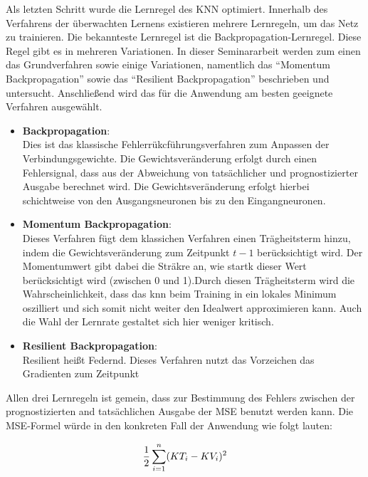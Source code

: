 Als letzten Schritt wurde die Lernregel des KNN optimiert. Innerhalb des Verfahrens der überwachten Lernens existieren mehrere Lernregeln, um das Netz zu trainieren. Die bekannteste Lernregel ist die Backpropagation-Lernregel. Diese Regel gibt es in mehreren Variationen. In dieser Seminararbeit werden zum einen das Grundverfahren sowie einige Variationen, namentlich das  "`Momentum Backpropagation"' sowie das "`Resilient Backpropagation"' beschrieben und untersucht. Anschließend wird das für die Anwendung am besten geeignete Verfahren ausgewählt.

\begin{itemize}
\item \textbf{Backpropagation}:\\
Dies ist das klassische Fehlerrükcführungsverfahren zum Anpassen der Verbindungsgewichte. Die Gewichtsveränderung erfolgt durch einen Fehlersignal, dass aus der Abweichung von tatsächlicher und prognostizierter Ausgabe berechnet wird. Die Gewichtsveränderung erfolgt hierbei schichtweise von den Ausgangsneuronen bis zu den Eingangneuronen.

\item \textbf{Momentum Backpropagation}:\\
Dieses Verfahren fügt dem klassichen Verfahren einen Trägheitsterm hinzu, indem die Gewichtsveränderung zum Zeitpunkt $t-1$ berücksichtigt wird. Der Momentumwert gibt dabei die Sträkre an, wie startk dieser Wert berücksichtigt wird (zwischen 0 und 1).Durch diesen Trägheitsterm wird die Wahrscheinlichkeit, dass das \acs{knn} beim Training in ein lokales Minimum oszilliert und sich somit nicht weiter den Idealwert approximieren kann. Auch die Wahl der Lernrate gestaltet sich hier weniger kritisch. 

\item \textbf{Resilient Backpropagation}:\\
Resilient heißt Federnd. Dieses Verfahren nutzt das Vorzeichen das Gradienten zum Zeitpunkt 

\end{itemize}


Allen drei Lernregeln ist gemein, dass zur Bestimmung des Fehlers zwischen der prognostizierten and tatsächlichen Ausgabe der MSE benutzt werden kann. Die MSE-Formel würde in den konkreten Fall der Anwendung wie folgt lauten:

\begin{equation}\formelentry{MSE zur Berechnung der Abweichung}
   \frac{1}{2}\sum^{n}_{i=1} (KT_{i} - KV_{i})^2
\end{equation}

